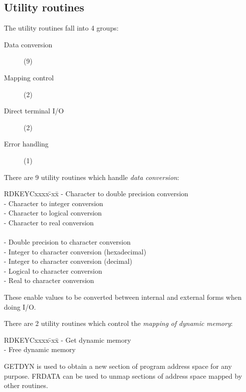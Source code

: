 \documentclass{article}
\begin{document}
\subsection {Utility routines}
The utility routines fall into 4 groups:
\begin{description}
\item [Data conversion] (9)
\item [Mapping control] (2)
\item [Direct terminal I/O] (2)
\item [Error handling] (1)
\end{description}
There are 9 utility routines which handle {\em data conversion}:
\begin{tabbing}
\hspace{40mm}RDKEYCxxxx\=-xx\=\kill
\hspace{40mm}{\bf CTOD} \>- \>Character to double precision conversion\\
\hspace{40mm}{\bf CTOI} \>- \>Character to integer conversion\\
\hspace{40mm}{\bf CTOL} \>- \>Character to logical conversion\\
\hspace{40mm}{\bf CTOR} \>- \>Character to real conversion\\
\\
\hspace{40mm}{\bf DTOC} \>- \>Double precision to character conversion\\
\hspace{40mm}{\bf HTOC} \>- \>Integer to character conversion (hexadecimal)\\
\hspace{40mm}{\bf ITOC} \>- \>Integer to character conversion (decimal)\\
\hspace{40mm}{\bf LTOC} \>- \>Logical to character conversion\\
\hspace{40mm}{\bf RTOC} \>- \>Real to character conversion
\end{tabbing}
These enable values to be converted between internal and external forms
when doing I/O.

There are 2 utility routines which control the {\em mapping of dynamic memory}:
\begin{tabbing}
\hspace{40mm}RDKEYCxxxx\=-xx\=\kill
\hspace{40mm}{\bf GETDYN} \>- \>Get dynamic memory\\
\hspace{40mm}{\bf FRDATA} \>- \>Free dynamic memory
\end{tabbing}
GETDYN is used to obtain a new section of program address space for any purpose.
FRDATA can be used to unmap sections of address space mapped by other routines.
\end{document}
